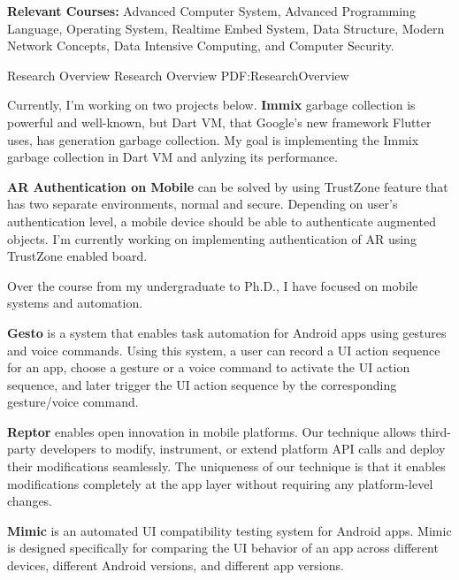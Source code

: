 \documentclass[letterpaper,MMMyyyy,nonstopmode]{simpleresumecv}
\begin{document}
\begin{Body}
\BigGap
\Entry
\textbf{Relevant Courses:} Advanced Computer System, Advanced Programming Language, Operating System, Realtime Embed System,
Data Structure, Modern Network Concepts, Data Intensive Computing,  and Computer Security.


\Section
{Research Overview}
{Research Overview}
{PDF:ResearchOverview}

\Entry
Currently, I'm working on two projects below.
\Gap
\BulletItem
\textbf{Immix} garbage collection is powerful and well-known, but Dart VM, that Google's 
new framework Flutter uses, has generation garbage collection. My goal is implementing the Immix garbage 
collection in Dart VM and anlyzing its performance.
\hfill

\Gap
\BulletItem
\textbf{AR Authentication on Mobile} can be solved by using TrustZone feature that has two separate environments, 
normal and secure. Depending on user's authentication level, a mobile device should be able to authenticate 
augmented objects. I'm currently working on implementing authentication of AR using TrustZone enabled board. 
\hfill

\Entry
Over the course from my undergraduate to Ph.D., I have focused on mobile systems and automation.

\Gap
\BulletItem
\textbf{Gesto} is a system that enables task automation for Android apps using gestures 
and voice commands. Using this system, a user can record a UI action sequence for an app, 
choose a gesture or a voice command to activate the UI action sequence, and later trigger 
the UI action sequence by the corresponding gesture/voice command.
\hfill

\Gap
\BulletItem
\textbf{Reptor} enables open innovation in mobile platforms. Our technique allows third-party 
developers to modify, instrument, or extend platform API calls and deploy their modifications 
seamlessly. The uniqueness of our technique is that it enables modifications completely at 
the app layer without requiring any platform-level changes. 
\hfill

\Gap
\BulletItem
\textbf{Mimic} is an automated UI compatibility testing system for Android apps. 
Mimic is designed specifically for comparing the UI behavior of an app across different 
devices, different Android versions, and different app versions.
\hfill




\end{Body}
\end{document}
